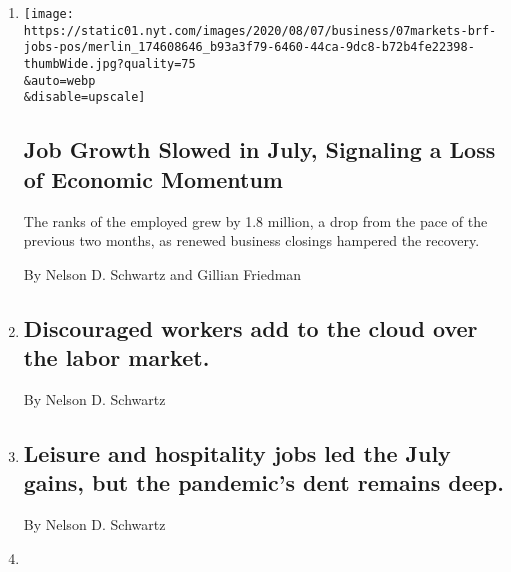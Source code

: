 \begin{enumerate}
\def\labelenumi{\arabic{enumi}.}
\item
  \href{/2020/08/07/business/economy/july-jobs-report.html}{}

  \texttt{[image: https://static01.nyt.com/images/2020/08/07/business/07markets-brf-jobs-pos/merlin\_174608646\_b93a3f79-6460-44ca-9dc8-b72b4fe22398-thumbWide.jpg?quality=75\\\&auto=webp\\\&disable=upscale]}

  \hypertarget{job-growth-slowed-in-july-signaling-a-loss-of-economic-momentum}{%
  \subsection{Job Growth Slowed in July, Signaling a Loss of Economic
  Momentum}\label{job-growth-slowed-in-july-signaling-a-loss-of-economic-momentum}}

  The ranks of the employed grew by 1.8 million, a drop from the pace of
  the previous two months, as renewed business closings hampered the
  recovery.

  By Nelson D. Schwartz and Gillian Friedman
\item
  \href{/2020/08/07/business/discouraged-workers-add-to-the-cloud-over-the-labor-market.html}{}

  \hypertarget{discouraged-workers-add-to-the-cloud-over-the-labor-market}{%
  \subsection{Discouraged workers add to the cloud over the labor
  market.}\label{discouraged-workers-add-to-the-cloud-over-the-labor-market}}

  By Nelson D. Schwartz
\item
  \href{/live/2020/08/07/business/stock-market-today-coronavirus/leisure-and-hospitality-jobs-led-the-july-gains-but-the-pandemics-dent-remains-deep}{}

  \hypertarget{leisure-and-hospitality-jobs-led-the-july-gains-but-the-pandemics-dent-remains-deep}{%
  \subsection{Leisure and hospitality jobs led the July gains, but the
  pandemic's dent remains
  deep.}\label{leisure-and-hospitality-jobs-led-the-july-gains-but-the-pandemics-dent-remains-deep}}

  By Nelson D. Schwartz
\item
  \href{/2020/08/07/business/as-a-temporary-closing-turns-permanent-an-owner-and-a-worker-try-to-carry-on.html}{}


\end{enumerate}
